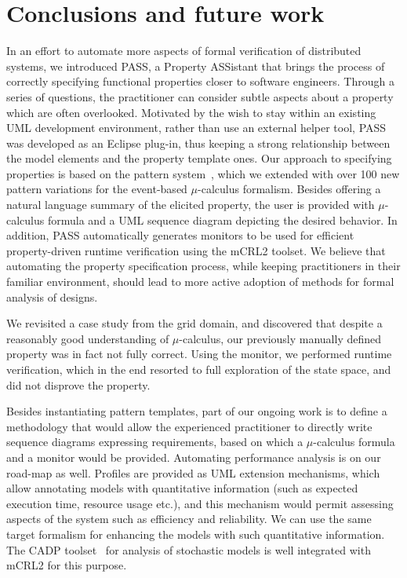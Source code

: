 \documentclass[letter]{llncs}
\begin{document}
\section{Conclusions and future work}
\label{sec:Conclusions}
\vspace{-8 pt}
In an effort to automate more aspects of formal verification of distributed
systems, we introduced PASS, a Property ASSistant that brings the process of
correctly specifying 
functional properties closer to software engineers.
Through a series of questions, the practitioner can
consider subtle aspects about a property which are often overlooked.
Motivated by the wish to stay within an existing UML development environment,
rather than use an external helper tool, PASS was developed as an Eclipse plug-in,
thus keeping a strong relationship between the model elements and the property template ones.
Our approach to specifying properties is based on the pattern system~\cite{Dwyer:1999:PPS:302405.302672},
which we extended with over 100 new pattern variations for the event-based $\mu$-calculus
formalism. Besides offering a natural language summary of the elicited property,
the user is provided with $\mu$-calculus formula and a UML sequence
diagram depicting the desired behavior. In addition, PASS
automatically generates monitors to be used for efficient property-driven 
runtime verification using the mCRL2 toolset. We believe that automating the property specification process, while keeping
practitioners in their familiar environment, should lead to more active adoption of methods for formal analysis of designs.

We revisited a case study from the grid domain, and discovered that 
despite a reasonably good understanding of $\mu$-calculus, our previously manually
defined property was in fact not fully correct. Using the monitor, we performed runtime verification, which in
the end resorted to full exploration of the state space, and did not disprove the property.

Besides instantiating pattern templates, part of our ongoing work is to define 
a methodology that would allow the experienced practitioner to directly 
write sequence diagrams expressing requirements, based on which a $\mu$-calculus formula and a monitor 
would be provided. Automating performance analysis is on our road-map as well. 
Profiles are provided as UML extension mechanisms, which allow 
annotating models with quantitative information (such as expected execution time, resource usage etc.),
and this mechanism would permit assessing aspects of the system
such as efficiency and reliability.
We can use the same target formalism for enhancing the models
with such quantitative information. The CADP toolset~\cite{DBLP:conf/tacas/GaravelLMS11} for analysis of stochastic
models is well integrated with mCRL2 for this purpose.
\vspace{-10 pt}
 
\vspace{-3 pt}

\end{document}
